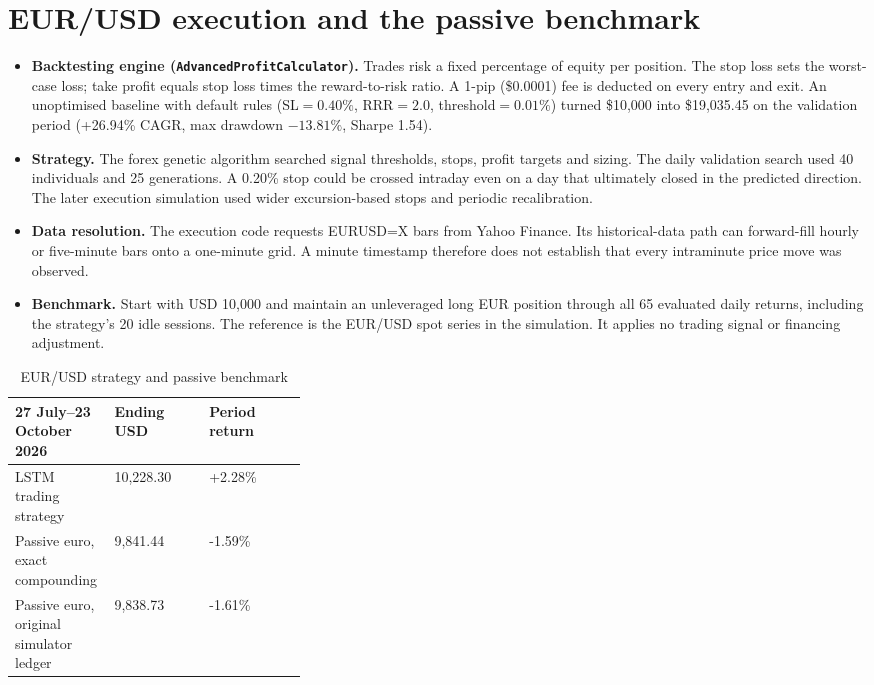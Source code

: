 \documentclass[12pt,a4paper,twoside,openany]{report}
\begin{document}
\section{EUR/USD execution and the passive benchmark}\label{exp:3}
\begin{itemize}\item \textbf{Backtesting engine (\texttt{AdvancedProfitCalculator}).} Trades risk a fixed percentage of equity per position. The stop loss sets the worst-case loss; take profit equals stop loss times the reward-to-risk ratio. A 1-pip (\$0.0001) fee is deducted on every entry and exit. An unoptimised baseline with default rules (SL$=0.40\%$, RRR$=2.0$, threshold$=0.01\%$) turned \$10{,}000 into \$19{,}035.45 on the validation period (+26.94\% CAGR, max drawdown $-13.81\%$, Sharpe 1.54).\end{itemize}
\begin{itemize}\item \textbf{Strategy.} The forex genetic algorithm searched signal thresholds, stops, profit targets and sizing. The daily validation search used 40 individuals and 25 generations. A 0.20\% stop could be crossed intraday even on a day that ultimately closed in the predicted direction. The later execution simulation used wider excursion-based stops and periodic recalibration.\end{itemize}
\begin{itemize}\item \textbf{Data resolution.} The execution code requests EURUSD=X bars from Yahoo Finance. Its historical-data path can forward-fill hourly or five-minute bars onto a one-minute grid. A minute timestamp therefore does not establish that every intraminute price move was observed.\end{itemize}
\begin{itemize}\item \textbf{Benchmark.} Start with USD 10,000 and maintain an unleveraged long EUR position through all 65 evaluated daily returns, including the strategy's 20 idle sessions. The reference is the EUR/USD spot series in the simulation. It applies no trading signal or financing adjustment.\end{itemize}
\begin{table}[htbp]\centering\singlespacing
\caption{EUR/USD strategy and passive benchmark}
\begin{tabularx}{\linewidth}{@{}p{0.34\linewidth}XX@{}}\toprule
27 July--23 October 2026 & Ending USD & Period return\\\midrule
LSTM trading strategy & 10,228.30 & +2.28\%\\
Passive euro, exact compounding & 9,841.44 & -1.59\%\\
Passive euro, original simulator ledger & 9,838.73 & -1.61\%\\
\bottomrule\end{tabularx}
\end{table}
\end{document}
